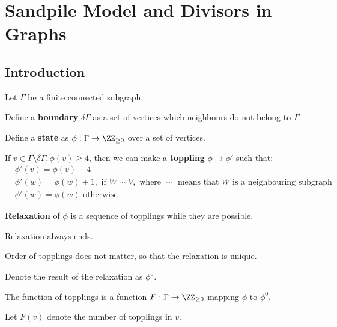 \documentclass[11pt]{scrartcl}
\begin{document}
  \section{Sandpile Model and Divisors in Graphs}

  \subsection{Introduction}

  \begin{definition}
    Let $\Gamma$ be a finite connected subgraph.

    Define a \textbf{boundary} $\delta \Gamma$ as a set of vertices which
    neighbours do not belong to $\Gamma$.

    Define a \textbf{state} as $\phi: \Gamma \to \ZZ_{\geq 0}$ over a set of
    vertices.

    If $v\in \Gamma \setminus \delta \Gamma, \phi(v) \geq 4$, then we can
    make a \textbf{toppling} $\phi \to \phi'$ such that:
    \begin{align}
      &\phi'(v) = \phi(v) - 4\\
      &\phi'(w) = \phi(w) + 1, \text{ if } W \sim V, \text{ where $\sim$ means that $W$ is a neighbouring subgraph}\\
      & \phi'(w) = \phi(w) \text{ otherwise}
    \end{align}

    \textbf{Relaxation} of $\phi$ is a sequence of topplings while they are possible.
  \end{definition}

  \begin{exercise}

    Relaxation always ends.

  \end{exercise}  


  \begin{exercise}

    Order of topplings does not matter, so that the relaxation is
    unique.

  \end{exercise}

  Denote the result of the relaxation as $\phi^{0}$.

  \begin{definition}
    The function of topplings is a function
    $F: \Gamma  \to \ZZ_{\geq 0}$ mapping $\phi$
    to $\phi^{0}$.

    Let $F(v)$ denote the number of topplings in $v$.
  \end{definition}
\end{document}
